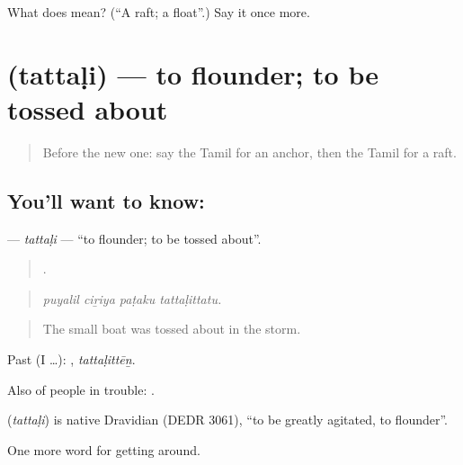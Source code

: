 \begin{tcolorbox}[breakable,colback=teal!4,colframe=teal!35!black,title={Before you move on}]
What does  mean? (\textquotedblleft{}A raft; a float\textquotedblright{}.) Say it once more.
\end{tcolorbox}
\section[\texorpdfstring{\ta{தத்தளி} (tattaḷi)}{தத்தளி (tattaḷi)}]{ (tattaḷi) — to flounder; to be tossed about}

\label{lesson:TA-C417-tattali}



\begin{quote}
Before the new one: say the Tamil for an anchor, then the Tamil for a raft.
\end{quote}

\subsection*{You'll want to know: }
\textbf{} — \emph{tattaḷi} — \textquotedblleft{}to flounder; to be tossed about\textquotedblright{}.

\begin{quote}
   .
\end{quote}

\begin{quote}
\emph{puyalil ciṟiya paṭaku tattaḷittatu.}
\end{quote}

\begin{quote}
The small boat was tossed about in the storm.
\end{quote}

Past (I …): , \emph{tattaḷittēṉ}.

Also of people in trouble:   .

\begin{cousinweb}
\textbf{} (\emph{tattaḷi}) is native Dravidian (DEDR 3061), \textquotedblleft{}to be greatly agitated, to flounder\textquotedblright{}.
\end{cousinweb}

\begin{grammarlens}[title={What you've built}]
One more word for getting around.
\end{grammarlens}

